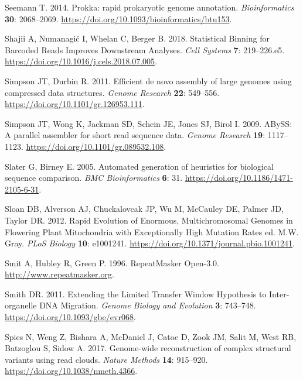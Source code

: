 \documentclass[
  12pt,
  oneside,
  openany]{book}
\begin{document}
\leavevmode\hypertarget{ref-Seemann_2014}{}%
Seemann T. 2014. Prokka: rapid prokaryotic genome annotation. \emph{Bioinformatics} \textbf{30}: 2068--2069. \url{https://doi.org/10.1093/bioinformatics/btu153}.

\leavevmode\hypertarget{ref-Shajii_2018}{}%
Shajii A, Numanagić I, Whelan C, Berger B. 2018. Statistical Binning for Barcoded Reads Improves Downstream Analyses. \emph{Cell Systems} \textbf{7}: 219--226.e5. \url{https://doi.org/10.1016/j.cels.2018.07.005}.

\leavevmode\hypertarget{ref-Simpson_2011}{}%
Simpson JT, Durbin R. 2011. Efficient de novo assembly of large genomes using compressed data structures. \emph{Genome Research} \textbf{22}: 549--556. \url{https://doi.org/10.1101/gr.126953.111}.

\leavevmode\hypertarget{ref-Simpson_2009}{}%
Simpson JT, Wong K, Jackman SD, Schein JE, Jones SJ, Birol I. 2009. ABySS: A parallel assembler for short read sequence data. \emph{Genome Research} \textbf{19}: 1117--1123. \url{https://doi.org/10.1101/gr.089532.108}.

\leavevmode\hypertarget{ref-Slater_2005}{}%
Slater G, Birney E. 2005. Automated generation of heuristics for biological sequence comparison. \emph{BMC Bioinformatics} \textbf{6}: 31. \url{https://doi.org/10.1186/1471-2105-6-31}.

\leavevmode\hypertarget{ref-Sloan_2012}{}%
Sloan DB, Alverson AJ, Chuckalovcak JP, Wu M, McCauley DE, Palmer JD, Taylor DR. 2012. Rapid Evolution of Enormous, Multichromosomal Genomes in Flowering Plant Mitochondria with Exceptionally High Mutation Rates ed. M.W. Gray. \emph{PLoS Biology} \textbf{10}: e1001241. \url{https://doi.org/10.1371/journal.pbio.1001241}.

\leavevmode\hypertarget{ref-Smit_1996}{}%
Smit A, Hubley R, Green P. 1996. RepeatMasker Open-3.0. \url{http://www.repeatmasker.org}.

\leavevmode\hypertarget{ref-Smith_2011}{}%
Smith DR. 2011. Extending the Limited Transfer Window Hypothesis to Inter-organelle DNA Migration. \emph{Genome Biology and Evolution} \textbf{3}: 743--748. \url{https://doi.org/10.1093/gbe/evr068}.

\leavevmode\hypertarget{ref-Spies_2017}{}%
Spies N, Weng Z, Bishara A, McDaniel J, Catoe D, Zook JM, Salit M, West RB, Batzoglou S, Sidow A. 2017. Genome-wide reconstruction of complex structural variants using read clouds. \emph{Nature Methods} \textbf{14}: 915--920. \url{https://doi.org/10.1038/nmeth.4366}.
\end{document}
